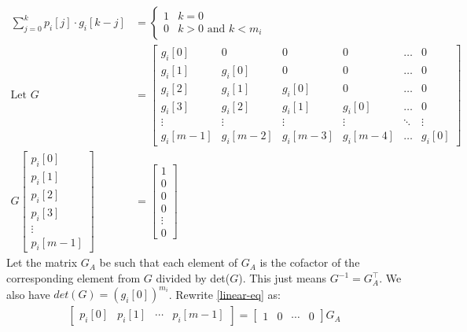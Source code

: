 \documentclass{article}
\begin{document}
\begin{align}
    \sum_{j=0}^{k} p_i[j]\cdot g_i[k-j] &= \begin{cases} 1 & k = 0\\ 0 & k>0 \textrm{ and } k<m_i\end{cases} \\
    \textrm{Let } G &= 
        \begin{bmatrix}
            g_i[0] & 0 & 0 & 0 & \dots  & 0 \\
            g_i[1] & g_i[0] & 0 & 0 &\dots  & 0 \\
            g_i[2] & g_i[1] & g_i[0] & 0 & \dots  & 0 \\
            g_i[3] & g_i[2] & g_i[1] & g_i[0] & \dots  & 0 \\
            \vdots & \vdots & \vdots & \vdots & \ddots & \vdots \\
            g_i[m-1] & g_i[m-2] & g_i[m-3] & g_i[m-4] & \dots  & g_i[0]
        \end{bmatrix}\\
    G 
        \begin{bmatrix}
            p_i[0] \\
            p_i[1] \\
            p_i[2] \\
            p_i[3] \\
            \vdots \\
            p_i[m-1]
        \end{bmatrix} &= \begin{bmatrix}
            1 \\
            0 \\
            0 \\
            0 \\
            \vdots \\
            0
        \end{bmatrix} 
        \label{linear-eq}
\end{align}
Let the matrix $G_A$ be such that each element of $G_A$ is the cofactor of the corresponding element from $G$ divided by det($G$). This just means $G^{-1} = G_A^\top $. We also have $det(G) = (g_i[0])^{m_i}$. Rewrite \eqref{linear-eq} as:
\begin{align}
    \begin{bmatrix}p_i[0] & p_i[1] & \cdots & p_i[m-1] \end{bmatrix} = \begin{bmatrix}1 & 0 & \cdots & 0\end{bmatrix} G_A
\end{align}
\end{document}
